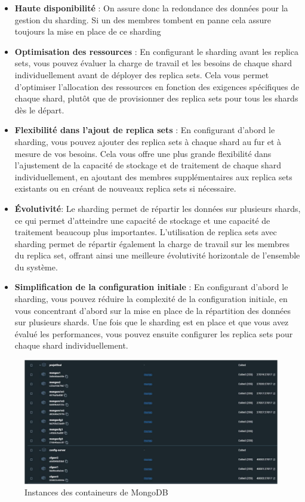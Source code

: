 \begin{itemize}
    \item \textbf{Haute disponibilité} : On assure donc la redondance des données pour la gestion du sharding. Si
    un des membres tombent en panne cela assure toujours la mise en place de ce sharding
    \item \textbf{Optimisation des ressources }: En configurant le sharding avant les replica sets, vous pouvez
    évaluer la charge de travail et les besoins de chaque shard individuellement avant de déployer
    des replica sets. Cela vous permet d'optimiser l'allocation des ressources en fonction des
    exigences spécifiques de chaque shard, plutôt que de provisionner des replica sets pour tous les
    shards dès le départ.
    \item \textbf{Flexibilité dans l'ajout de replica sets }: En configurant d'abord le sharding, vous pouvez ajouter
    des replica sets à chaque shard au fur et à mesure de vos besoins. Cela vous offre une plus
    grande flexibilité dans l'ajustement de la capacité de stockage et de traitement de chaque shard
    individuellement, en ajoutant des membres supplémentaires aux replica sets existants ou en
    créant de nouveaux replica sets si nécessaire.
    \item \textbf{Évolutivité}: Le sharding permet de répartir les données sur plusieurs shards, ce qui permet
    d'atteindre une capacité de stockage et une capacité de traitement beaucoup plus importantes.
    L'utilisation de replica sets avec sharding permet de répartir également la charge de travail sur
    les membres du replica set, offrant ainsi une meilleure évolutivité horizontale de l'ensemble du
    système.
    \item \textbf{Simplification de la configuration initiale }: En configurant d'abord le sharding, vous pouvez
    réduire la complexité de la configuration initiale, en vous concentrant d'abord sur la mise en
    place de la répartition des données sur plusieurs shards. Une fois que le sharding est en place et
    que vous avez évalué les performances, vous pouvez ensuite configurer les replica sets pour
    chaque shard individuellement.
\end{itemize}

\begin{figure}[H]
    \centering
    \includegraphics[width=\textwidth]{./img/alex.png}
    \caption{Instances des containeurs de MongoDB}
    \label{fig:alex-container-instance}
\end{figure}

